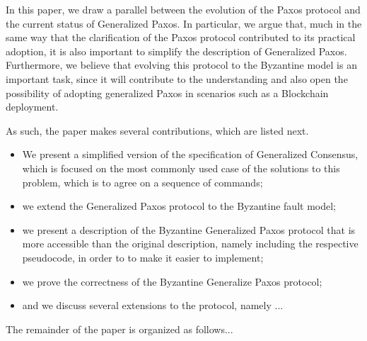 
In this paper, we draw a parallel between the evolution of the Paxos
protocol and the current status of Generalized Paxos. In particular,
we argue that, much in the same way that the clarification of the Paxos
protocol contributed to its practical adoption, it is also important
to simplify the description of Generalized Paxos. Furthermore, we believe
that evolving this protocol to the Byzantine model is an important
task, since it will contribute to the understanding
and also open the possibility of adopting generalized Paxos in
scenarios such as a Blockchain deployment.



As such, the paper makes several contributions, which are listed next.


\begin{itemize}

\item
We present a simplified version of the specification of Generalized
Consensus, which is focused on the most commonly used case of the
solutions to this problem, which is to agree on a sequence of
commands;

\item
we extend the Generalized Paxos protocol to the Byzantine fault model; 

\item
we present a description of the Byzantine Generalized Paxos protocol
that is more accessible than the original description, namely including the
respective pseudocode, in order to to make it 
easier to implement;

\item
we prove the correctness of the Byzantine Generalize Paxos protocol;

\item
and we discuss several extensions to the protocol, namely ...


\end{itemize}

The remainder of the paper is organized as follows...
